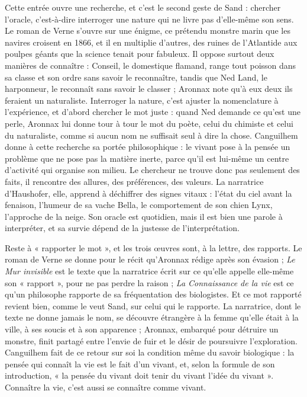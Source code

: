 \documentclass[11pt,a4paper]{article}
\begin{document}
Cette entrée ouvre une recherche, et c'est le second geste de Sand : chercher l'oracle, c'est-à-dire interroger une nature qui ne livre pas d'elle-même son sens. Le roman de Verne s'ouvre sur une énigme, ce prétendu monstre marin que les navires croisent en 1866, et il en multiplie d'autres, des ruines de l'Atlantide aux poulpes géants que la science tenait pour fabuleux. Il oppose surtout deux manières de connaître : Conseil, le domestique flamand, range tout poisson dans sa classe et son ordre sans savoir le reconnaître, tandis que Ned Land, le harponneur, le reconnaît sans savoir le classer ; Aronnax note qu'à eux deux ils feraient un naturaliste. Interroger la nature, c'est ajuster la nomenclature à l'expérience, et d'abord chercher le mot juste : quand Ned demande ce qu'est une perle, Aronnax lui donne tour à tour le mot du poète, celui du chimiste et celui du naturaliste, comme si aucun nom ne suffisait seul à dire la chose. Canguilhem donne à cette recherche sa portée philosophique : le vivant pose à la pensée un problème que ne pose pas la matière inerte, parce qu'il est lui-même un centre d'activité qui organise son milieu. Le chercheur ne trouve donc pas seulement des faits, il rencontre des allures, des préférences, des valeurs. La narratrice d'Haushofer, elle, apprend à déchiffrer des signes vitaux : l'état du ciel avant la fenaison, l'humeur de sa vache Bella, le comportement de son chien Lynx, l'approche de la neige. Son oracle est quotidien, mais il est bien une parole à interpréter, et sa survie dépend de la justesse de l'interprétation.

Reste à « rapporter le mot », et les trois œuvres sont, à la lettre, des rapports. Le roman de Verne se donne pour le récit qu'Aronnax rédige après son évasion ; \emph{Le Mur invisible} est le texte que la narratrice écrit sur ce qu'elle appelle elle-même son « rapport », pour ne pas perdre la raison ; \emph{La Connaissance de la vie} est ce qu'un philosophe rapporte de sa fréquentation des biologistes. Et ce mot rapporté revient bien, comme le veut Sand, sur celui qui le rapporte. La narratrice, dont le texte ne donne jamais le nom, se découvre étrangère à la femme qu'elle était à la ville, à ses soucis et à son apparence ; Aronnax, embarqué pour détruire un monstre, finit partagé entre l'envie de fuir et le désir de poursuivre l'exploration. Canguilhem fait de ce retour sur soi la condition même du savoir biologique : la pensée qui connaît la vie est le fait d'un vivant, et, selon la formule de son introduction, « la pensée du vivant doit tenir du vivant l'idée du vivant ». Connaître la vie, c'est aussi se connaître comme vivant.
\end{document}
